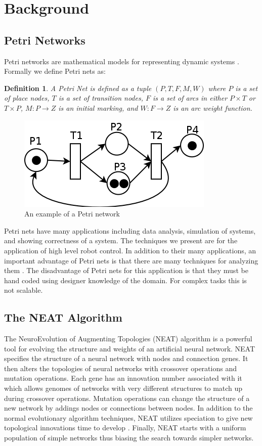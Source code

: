 \documentclass[12pt,a4paper,twocolumn]{article}
\newtheorem{myDef}{Definition}
\begin{document}
\section{Background}

\subsection{Petri Networks}
Petri networks are mathematical models for representing dynamic systems \cite{ziparo2011petri}. Formally we define Petri nets as:
\begin{myDef}
A Petri Net is defined as a tuple $(P,T,F,M,W)$ where $P$ is a set of place nodes, $T$ is a set of transition nodes, $F$ is a set of arcs in either $P \times T$ or $T \times P$, $M: P \rightarrow Z$ is an initial marking, and $W: F \rightarrow Z$ is an arc weight function.
\end{myDef}
\begin{figure}[h]
\centering
\includegraphics[scale=0.25]{petri_net.png}
\caption[]{An example of a Petri network \label{exampleNet}}
\end{figure}
Petri nets have many applications including data analysis, simulation of systems, and showing correctness of a system. The techniques we present are for the application of high level robot control. In addition to their many applications, an important advantage of Petri nets is that there are many techniques for analyzing them \cite{barrett2010architecture}. The disadvantage of Petri nets for this application is that they must be hand coded using designer knowledge of the domain. For complex tasks this is not scalable.

\subsection{The NEAT Algorithm}

The NeuroEvolution of Augmenting Topologies (NEAT) algorithm is a powerful tool for evolving the structure and weights of an artificial neural network. NEAT specifies the structure of a neural network with nodes and connection genes. It then alters the topologies of neural networks with crossover operations and mutation operations. Each gene has an innovation number associated with it which allows genomes of networks with very different structures to match up during crossover operations. Mutation operations can change the structure of a new network by addings nodes or connections between nodes. In addition to the normal evolutionary algorithm techniques, NEAT utilizes speciation to give new topological innovations time to develop \cite{neat}. Finally, NEAT starts with a uniform population of simple networks thus biasing the search towards simpler networks.
\end{document}
